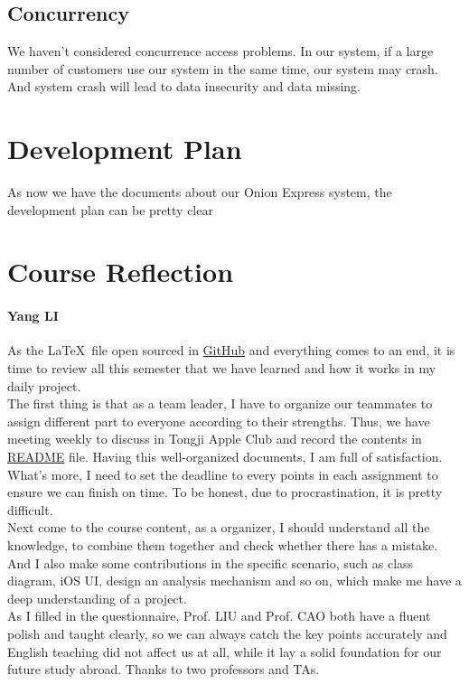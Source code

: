\documentclass[12pt]{scrreprt}
\begin{document}
\section{Concurrency}
We haven't considered concurrence access problems. In our system, if a large number of customers use our system in the same time, our system may  crash.  And system crash will lead to data insecurity and data missing.
\chapter{Development Plan}
As now we have the documents about our Onion Express system, the development plan can be pretty clear

\chapter{Course Reflection}
\subsubsection{Yang LI}
As the \LaTeX\ file open sourced in \href{https://github.com/zjzsliyang/OnionExpress}{GitHub} and everything comes to an end, it is time to review all this semester that we have learned and how it works in my daily project.\\
The first thing is that as a team leader, I have to organize our teammates to assign different part to everyone according to their strengths. Thus, we have meeting weekly to discuss in Tongji Apple Club and record the contents in \href{https://github.com/zjzsliyang/OnionExpress/blob/master/README.md}{README} file. Having this well-organized documents, I am full of satisfaction. What's more, I need to set the deadline to every points in each assignment to ensure we can finish on time. To be honest, due to procrastination, it is pretty difficult.\\
Next come to the course content, as a organizer, I should understand all the knowledge, to combine them together and check whether there has a mistake. And I also make some contributions in the specific scenario, such as class diagram, iOS UI, design an analysis mechanism and so on, which make me have a deep understanding of a project.\\
As I filled in the questionnaire, Prof. LIU and Prof. CAO both have a fluent polish and taught clearly, so we can always catch the key points accurately and English teaching did not affect us at all, while it lay a solid foundation for our future study abroad. Thanks to two professors and TAs.
\end{document}
